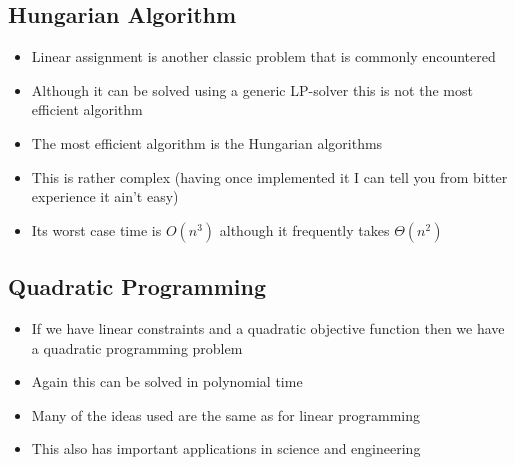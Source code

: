 
\begin{slide}
\section{Hungarian Algorithm}

\begin{PauseHighLight}
  \begin{itemize}
  \item Linear assignment is another classic problem that is commonly
    encountered\pause
  \item Although it can be solved using a generic LP-solver this is not
    the most efficient algorithm\pause
  \item The most efficient algorithm is the Hungarian algorithms\pause
  \item This is rather complex (having once implemented it I can tell
    you from bitter experience it ain't easy)\pause
  \item Its worst case time is $O(n^3)$ although it frequently takes
    $\Theta(n^2)$\pause
  \end{itemize}
\end{PauseHighLight}

\end{slide}

\begin{slide}
\section{Quadratic Programming}

\begin{PauseHighLight}
  \begin{itemize}
  \item If we have linear constraints and a quadratic objective function
    then we have a quadratic programming problem\pause
  \item Again this can be solved in polynomial time\pause
  \item Many of the ideas used are the same as for linear programming\pause
  \item This also has important applications in science and
    engineering\pause
  \end{itemize}
\end{PauseHighLight}

\end{slide}

